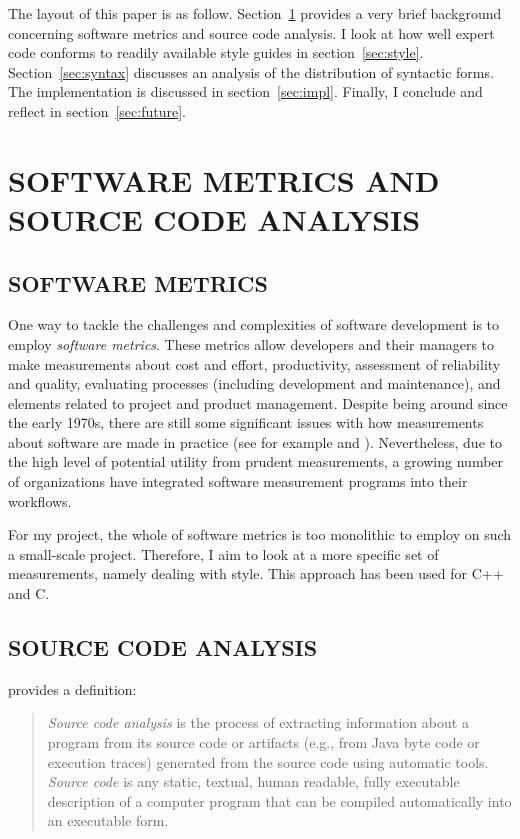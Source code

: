 \documentclass[12pt,abstracton]{scrartcl}
\begin{document}
The layout of this paper is as follow.
Section~\ref{sec:metric} provides a very brief background
concerning software metrics and source code analysis.
I look at how well expert code conforms to readily available
style guides in section~\ref{sec:style}.
Section~\ref{sec:syntax} discusses an analysis
of the distribution of syntactic forms. The implementation is discussed
in section~\ref{sec:impl}. Finally, I conclude and reflect in section~\ref{sec:future}.
\section{SOFTWARE METRICS AND SOURCE CODE ANALYSIS}\label{sec:metric}
\subsection{SOFTWARE METRICS}
One way to tackle the challenges and complexities of software development is to employ
\emph{software metrics}. These metrics allow developers and their managers to make
measurements about cost and effort, productivity, assessment of reliability and
quality, evaluating processes (including development and maintenance), and elements
related to project and product management.\cite{Ord08} Despite being around since
the early 1970s, there are still some significant issues with how measurements
about software are made in practice (see for example \cite{Jon94} and \cite{Bou12}).
Nevertheless, due to the high level of potential utility from prudent measurements,
a growing number of organizations have integrated software measurement programs into
their workflows.\cite{Ord08}

For my project, the whole of software metrics is too monolithic to employ on
such a small-scale project. Therefore, I aim to look at a more specific set of measurements,
namely dealing with style. This approach has been used for C++\cite{Aye98} and C\cite{Tak11}.
\subsection{SOURCE CODE ANALYSIS}
\cite{Bin07} provides a definition:
\begin{quote}
\emph{Source code analysis} is the process of extracting
information about a program from its source code
or artifacts (e.g., from Java byte code or execution
traces) generated from the source code using automatic tools.
\emph{Source code} is any static, textual,
human readable, fully executable description of
a computer program that can be compiled automatically into an executable form.
\end{quote}
\end{document}
